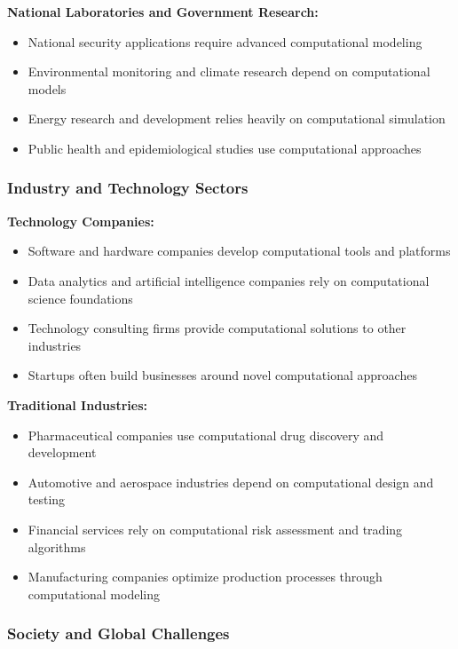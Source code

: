 \textbf{National Laboratories and Government Research:}
\begin{itemize}
    \item National security applications require advanced computational modeling
    \item Environmental monitoring and climate research depend on computational models
    \item Energy research and development relies heavily on computational simulation
    \item Public health and epidemiological studies use computational approaches
\end{itemize}

\subsubsection{Industry and Technology Sectors}

\textbf{Technology Companies:}
\begin{itemize}
    \item Software and hardware companies develop computational tools and platforms
    \item Data analytics and artificial intelligence companies rely on computational science foundations
    \item Technology consulting firms provide computational solutions to other industries
    \item Startups often build businesses around novel computational approaches
\end{itemize}

\textbf{Traditional Industries:}
\begin{itemize}
    \item Pharmaceutical companies use computational drug discovery and development
    \item Automotive and aerospace industries depend on computational design and testing
    \item Financial services rely on computational risk assessment and trading algorithms
    \item Manufacturing companies optimize production processes through computational modeling
\end{itemize}

\subsubsection{Society and Global Challenges}

